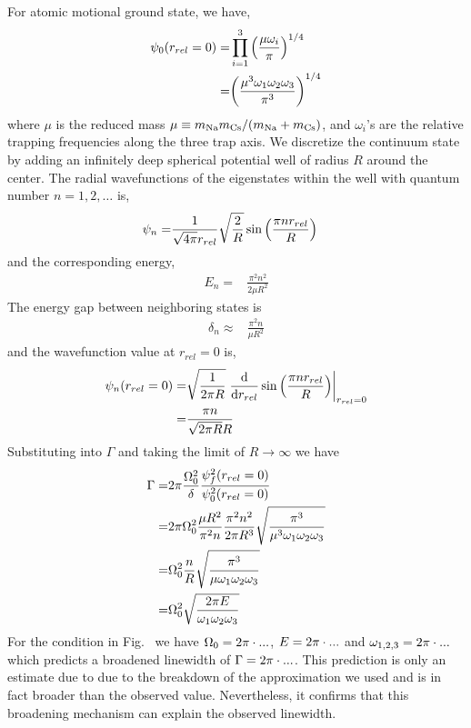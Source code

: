 For atomic motional ground state, we have,
\begin{align*}
  \psi_0\paren{r_{rel}=0}=&\prod_{i=1}^{3}\paren{\frac{\mu\omega_i}{\pi}}^{1/4}\\
  =&\paren{\frac{\mu^3\omega_1\omega_2\omega_3}{\pi^3}}^{1/4}
\end{align*}
where $\mu$ is the reduced mass $\mu\equiv m_\Na m_\Cs/\paren{m_\Na+m_\Cs}$,
and $\omega_i$'s are the relative trapping frequencies along the three trap axis.
We discretize the continuum state by adding an infinitely deep spherical potential well
of radius $R$ around the center. The radial wavefunctions of the eigenstates
within the well with quantum number $n=1,2,\dots$ is,
\begin{align*}
  \psi_n=&\frac{1}{\sqrt{4\pi}r_{rel}}\sqrt{\frac{2}{R}}\sin\paren{\frac{\pi nr_{rel}}{R}}
\end{align*}
and the corresponding energy,
\begin{align*}
  E_n=&\frac{\pi^2n^2}{2\mu R^2}
\end{align*}
The energy gap between neighboring states is
\begin{align*}
  \delta_n\approx&\frac{\pi^2n}{\mu R^2}
\end{align*}
and the wavefunction value at $r_{rel}=0$ is,
\begin{align*}
  \psi_n\paren{r_{rel}=0}=&\sqrt{\frac{1}{2\pi R}}\left.\frac{\ud}{\ud r_{rel}}\sin\paren{\frac{\pi nr_{rel}}{R}}\right|_{r_{rel}=0}\\
  =&\frac{\pi n}{\sqrt{2\pi R}R}
\end{align*}
Substituting into $\Gamma$ and taking the limit of $R\rightarrow\infty$ we have
\begin{align*}
  \Gamma=&2\pi\frac{\Omega_0^2}{\delta}\frac{\psi_f^2\paren{r_{rel}=0}}{\psi_0^2\paren{r_{rel}=0}}\\
  =&2\pi\Omega_0^2\frac{\mu R^2}{\pi^2n}\frac{\pi^2 n^2}{2\pi R^3}\sqrt{\frac{\pi^3}{\mu^3\omega_1\omega_2\omega_3}}\\
  =&\Omega_0^2\frac{n}{R}\sqrt{\frac{\pi^3}{\mu\omega_1\omega_2\omega_3}}\\
  =&\Omega_0^2\sqrt{\frac{2\pi E}{\omega_1\omega_2\omega_3}}
\end{align*}
For the condition in Fig.~\todo{\ref{}} we have $\Omega_0=2\pi\cdot\todo{number}...$,
$E=2\pi\cdot\todo{number}...$ and $\omega_{1,2,3}=2\pi\cdot\todo{number}...$
which predicts a broadened linewidth of $\Gamma=2\pi\cdot\todo{number}...$.
This prediction is only an estimate due to due to the breakdown of the approximation
we used and is in fact broader than the observed value.
Nevertheless, it confirms that this broadening mechanism can explain the observed linewidth.


